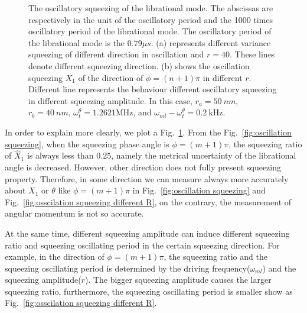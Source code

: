 \documentclass[pra,aps,superscriptaddress,showpacs,preprint]{revtex4}%
\begin{document}
 \begin{figure}
\centering
{}
 \caption{The oscillatory squeezing of the librational mode. The abscissas are respectively in the unit of the oscillatory period and the 1000 times oscillatory period of the librational mode. The oscillatory period of the librational mode is the $0.79\mu s$. (a) represents different variance squeezing of different direction in oscillation and $r=40$. These lines denote different squeezing direction. (b)  shows the oscillation squeezing $X_{1}$ of the direction of $\phi=(n+1)\pi$ in different $r$. Different line represents the behaviour different oscillatory squeezing in different squeezing amplitude. In this case, $r_{a}=50~nm$, $r_{b}=40~nm$, $\omega_{t}^{\theta}=1.2621\text{MHz}$, and $\omega_{ml}-\omega_{t}^{\theta}=0.2~\text{kHz}$. }
 \label{fig:oscillatory squeezing and amplifying}
\end{figure}

 In order to explain more clearly, we plot a Fig.~\ref{fig:oscillatory squeezing and amplifying}. From the Fig.~\ref{fig:oscillation squeezing}, when the squeezing phase angle is $\phi=(m+1)\pi$, the squeezing ratio of $\hat{X}_1$ is always less than $0.25$, namely the metrical uncertainty of the librational angle is decreased. However, other direction does not fully present squeezing property.
Therefore, in some direction we can measure always more accurately about $X_{1}$ or $\theta$ like $\phi=(m+1)\pi$ in Fig.~\ref{fig:oscillation squeezing} and Fig.~\ref{fig:osscilation squeezing different R}, on the contrary, the measurement of angular momentum is not so accurate.

At the same time, different squeezing amplitude can induce different squeezing ratio and squeezing oscillating period in the certain squeezing direction. For example, in the direction of $\phi=(m+1)\pi$, the squeezing ratio and the squeezing oscillating period is determined by the driving frequency($\omega_{ml}$) and the squeezing amplitude($r$). The bigger squeezing amplitude causes the larger squeezing ratio, furthermore, the squeezing oscillating period is smaller show as Fig.~\ref{fig:osscilation squeezing different R}.
\end{document}
